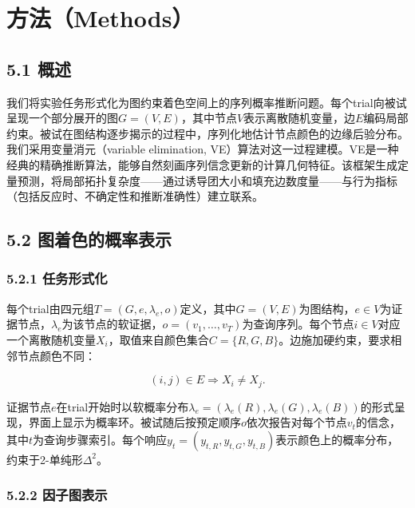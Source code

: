 \section{方法（Methods）}

\subsection*{5.1 概述}

我们将实验任务形式化为图约束着色空间上的序列概率推断问题。每个trial向被试呈现一个部分展开的图$G=(V,E)$，其中节点$V$表示离散随机变量，边$E$编码局部约束。被试在图结构逐步揭示的过程中，序列化地估计节点颜色的边缘后验分布。我们采用变量消元（variable elimination, VE）算法对这一过程建模。VE是一种经典的精确推断算法，能够自然刻画序列信念更新的计算几何特征。该框架生成定量预测，将局部拓扑复杂度——通过诱导团大小和填充边数度量——与行为指标（包括反应时、不确定性和推断准确性）建立联系。

\subsection*{5.2 图着色的概率表示}

\subsubsection*{5.2.1 任务形式化}

每个trial由四元组$T=(G, e, \lambda_e, o)$定义，其中$G=(V,E)$为图结构，$e \in V$为证据节点，$\lambda_e$为该节点的软证据，$o=(v_1,\ldots,v_T)$为查询序列。每个节点$i \in V$对应一个离散随机变量$X_i$，取值来自颜色集合$C=\{R,G,B\}$。边施加硬约束，要求相邻节点颜色不同：

\begin{equation*}
(i,j)\in E \Rightarrow X_i \neq X_j.
\end{equation*}

证据节点$e$在trial开始时以软概率分布$\lambda_e=(\lambda_e(R), \lambda_e(G), \lambda_e(B))$的形式呈现，界面上显示为概率环。被试随后按预定顺序$o$依次报告对每个节点$v_t$的信念，其中$t$为查询步骤索引。每个响应$y_t=(y_{t,R}, y_{t,G}, y_{t,B})$表示颜色上的概率分布，约束于2-单纯形$\Delta^2$。

\subsubsection*{5.2.2 因子图表示}

